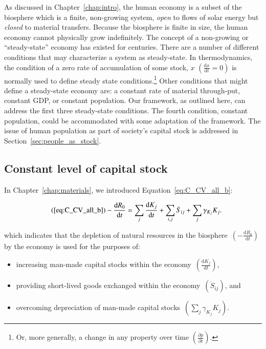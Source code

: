 As discussed in Chapter~\ref{chap:intro},
the human economy is a subset of the biosphere which is a
finite, non-growing system,
\emph{open} to flows of solar energy but \emph{closed}
to material transfers.
Because the biosphere is finite in size,
the human economy cannot physically grow indefinitely.
The concept of a non-growing or ``steady-state'' economy
has existed for centuries.
There are a number of different
conditions that may characterize a system as steady-state.
In thermodynamics,
the condition of a zero rate of accumulation
of some stock, $x$
$\left(\frac{\mathrm{d}x}{\mathrm{d}t} = 0\right)$
is normally used to define steady state conditions.\footnote{Or,
more generally,
a change in any property over time
$\left(\frac{\partial p}{\partial t}\right)$.}
Other conditions that might define a steady-state
economy are:
a constant rate of material through-put,
constant GDP, or constant population.
Our framework,
as outlined here,
can address the first three steady-state conditions.
The fourth condition, constant population, could be
accommodated with some adaptation of the 
framework. 
The issue of human population as part of society's
capital stock is addressed in Section~\ref{sec:people_as_stock}.


\subsection{Constant level of capital stock}

In Chapter~\ref{chap:materials}, 
we introduced Equation~\ref{eq:C_CV_all_b}:

\begin{align}\tag{\ref{eq:C_CV_all_b}}
	- \frac{\mathrm{d}R_{0}}{\mathrm{d}t}										&
	=\sum_{j}\frac{\mathrm{d}K_{j}}{\mathrm{d}t}
	+ \sum_{i,j}\dot{S}_{ij}
	+ \sum_{j}\gamma_{K_{j}}K_{j}.
\end{align}

\noindent{}which indicates that 
the depletion of natural resources in the 
biosphere~$\left(- \frac{\mathrm{d}R_{0}}{\mathrm{d}t}\right)$
by the economy
is used for the purposes of:

\begin{itemize}
	\item{increasing man-made capital stocks
	within the economy~$\left(\frac{\mathrm{d}K_{j}}{\mathrm{d}t}\right)$,}
	\item{providing short-lived goods exchanged within the
	economy~$\left(\dot{S}_{ij}\right)$, and}
	\item{overcoming depreciation of man-made
	capital stocks~$\left(\sum_{j}\gamma_{K_{j}}K_{j}\right)$.}
\end{itemize}

